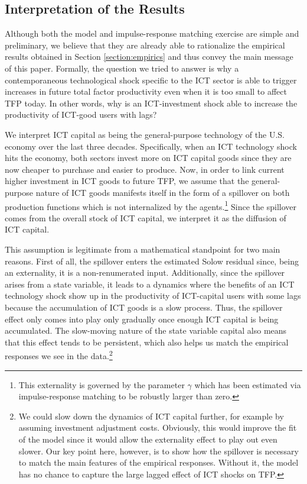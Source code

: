 \documentclass[12pt]{article}
\begin{document}
\subsection{Interpretation of the Results}\label{section:Interpretation_theory}

Although both the model and impulse-response matching exercise are simple and preliminary, we believe that they are already able to rationalize the empirical results obtained in Section \ref{section:empirics} and thus convey the main message of this paper. Formally, the question we tried to answer is why a contemporaneous technological shock specific to the ICT sector is able to trigger increases in future total factor productivity even when it is too small to affect TFP today. In other words, why is an ICT-investment shock able to increase the productivity of ICT-good users with lags?

We interpret ICT capital as being the general-purpose technology of the U.S. economy over the last three decades. Specifically, when an ICT technology shock hits the economy, both sectors invest more on ICT capital goods since they are now cheaper to purchase and easier to produce. Now, in order to link current higher investment in ICT goods to future TFP, we assume that the general-purpose nature of ICT goods manifests itself in the form of a spillover on both production functions which is not internalized by the agents.\footnote{This externality is governed by the parameter $\gamma$ which has been estimated via impulse-response matching to be robustly larger than zero.} Since the spillover comes from the overall stock of ICT capital, we interpret it as the diffusion of ICT capital.

This assumption is legitimate from a mathematical standpoint for two main reasons. First of all, the spillover enters the estimated Solow residual since, being an externality, it is a non-renumerated input. Additionally, since the spillover arises from a state variable, it leads to a dynamics where the benefits of an ICT technology shock show up in the productivity of ICT-capital users with some lags because the accumulation of ICT goods is a slow process. Thus, the spillover effect only comes into play only gradually once enough ICT capital is being accumulated. The slow-moving nature of the state variable capital also means that this effect tends to be persistent, which also helps us match the empirical responses we see in the data.\footnote{We could slow down the dynamics of ICT capital further, for example by assuming investment adjustment costs. Obviously, this would improve the fit of the model since it would allow the externality effect to play out even slower. Our key point here, however, is to show how the spillover is necessary to match the main features of the empirical responses. Without it, the model has no chance to capture the large lagged effect of ICT shocks on TFP.}
\end{document}
